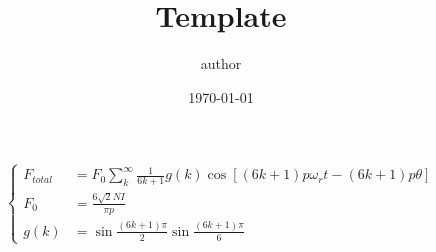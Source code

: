\documentclass[UTF-8]{MyTemplate}
\begin{document}
\title{Template}
\author{author}
\date{\today}
\maketitle
% 


\begin{equation}
	\left\{
		\begin{aligned}
			\label{eq:demo}
			F_{total} &= F_0 \sum_{k}^{\infty} \frac{1}{6k+1} g(k) \cos[(6k+1)p\omega_r t -(6k+1)p\theta]\\
			F_0 &= \frac{6 \sqrt{2} N I}{\pi p}\\
			g(k) &= \sin \frac{(6k+1)\pi}{2} \sin \frac{(6k+1)\pi}{6}
		\end{aligned}
	\right.
\end{equation}



\newpage

\end{document}
